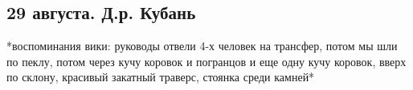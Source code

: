 \subsection{29 августа. Д.р. Кубань}
*воспоминания вики: руководы отвели 4-х человек на трансфер, потом мы шли по пеклу, потом через кучу коровок и погранцов и еще одну кучу коровок, вверх по склону, красивый закатный траверс, стоянка среди камней*
\newpage